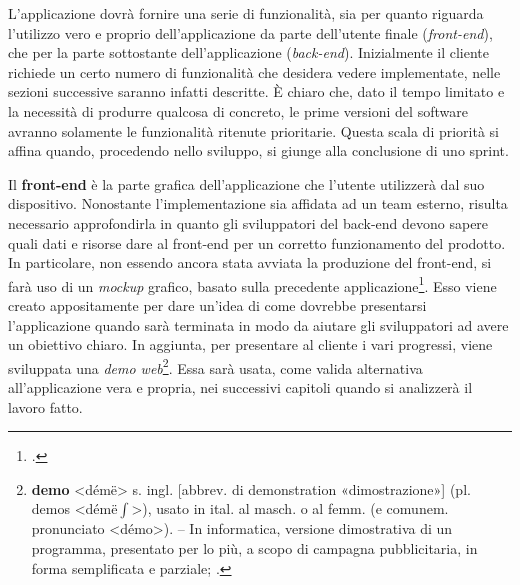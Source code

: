 \documentclass[./main.tex]{subfiles}
\begin{document}
L'applicazione dovrà fornire una serie di funzionalità, sia per quanto riguarda l'utilizzo vero e proprio dell'applicazione da parte dell'utente finale (\textit{front-end}), che per la parte sottostante dell'applicazione (\textit{back-end}). Inizialmente il cliente richiede un certo numero di funzionalità che desidera vedere implementate, nelle sezioni successive saranno infatti descritte. È chiaro che, dato il tempo limitato e la necessità di produrre qualcosa di concreto, le prime versioni del software avranno solamente le funzionalità ritenute prioritarie. Questa scala di priorità si affina quando, procedendo nello sviluppo, si giunge alla conclusione di uno sprint.\par

Il \textbf{front-end} è la parte grafica dell'applicazione che l'utente utilizzerà dal suo dispositivo. Nonostante l'implementazione sia affidata ad un team esterno, risulta necessario approfondirla in quanto gli sviluppatori del back-end devono sapere quali dati e risorse dare al front-end per un corretto funzionamento del prodotto. In particolare, non essendo ancora stata avviata la produzione del front-end, si farà uso di un \textit{mockup} grafico, basato sulla precedente applicazione\footcite[https://www.ismar.cnr.it/terza-missione/app/\#2]{website-ismar-cnr}. Esso viene creato appositamente per dare un'idea di come dovrebbe presentarsi l'applicazione quando sarà terminata in modo da aiutare gli sviluppatori ad avere un obiettivo chiaro. In aggiunta, per presentare al cliente i vari progressi, viene sviluppata una \textit{demo web}\footnote{\textbf{demo} <démë> s. ingl. [abbrev. di demonstration «dimostrazione»] (pl. demos <démë$\int$>), usato in ital. al masch. o al femm. (e comunem. pronunciato <démo>). – In informatica, versione dimostrativa di un programma, presentato per lo più, a scopo di campagna pubblicitaria, in forma semplificata e parziale; \cite{treccani-demo}.}. Essa sarà usata, come valida alternativa all'applicazione vera e propria, nei successivi capitoli quando si analizzerà il lavoro fatto.\par
\end{document}

